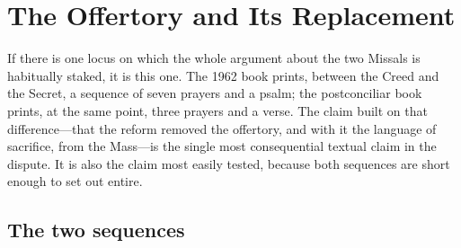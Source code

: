 \section{The Offertory and Its Replacement}

If there is one locus on which the whole argument about the two Missals is habitually staked, it is this one. The 1962 book prints, between the Creed and the Secret, a sequence of seven prayers and a psalm; the postconciliar book prints, at the same point, three prayers and a verse. The claim built on that difference---that the reform removed the offertory, and with it the language of sacrifice, from the Mass---is the single most consequential textual claim in the dispute. It is also the claim most easily tested, because both sequences are short enough to set out entire.

\subsection{The two sequences}

